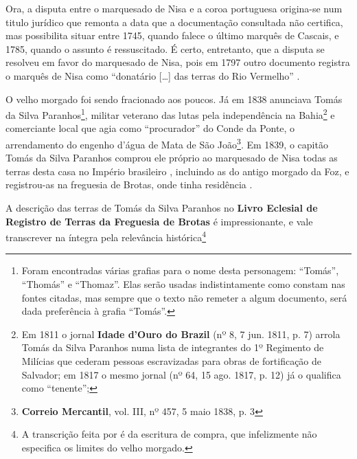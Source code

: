 Ora, a disputa entre o marquesado de Nisa e a coroa portuguesa origina-se num titulo jurídico que remonta a data que a documentação consultada não certifica, mas possibilita situar entre 1745, quando falece o último marquês de Cascais, e 1785, quando o assunto é ressuscitado. É certo, entretanto, que a disputa se resolveu em favor do marquesado de Nisa, pois em 1797 outro documento registra o marquês de Nisa como ``donatário [\dots] das terras do Rio Vermelho'' \cite[p.~543]{ramiz_expos_1881}.

O velho morgado foi sendo fracionado aos poucos. Já em 1838 anunciava Tomás da Silva Paranhos\footnote{Foram encontradas várias grafias para o nome desta personagem: ``Tomás'', ``Thomás'' e ``Thomaz''. Elas serão usadas indistintamente como constam nas fontes citadas, mas sempre que o texto não remeter a algum documento, será dada preferência à grafia ``Tomás''.}, militar veterano das lutas pela independência na Bahia\footnote{Em 1811 o jornal \textbf{Idade d'Ouro do Brazil} (nº 8, 7 jun. 1811, p. 7) arrola Tomás da Silva Paranhos numa lista de integrantes do 1º Regimento de Milícias que cederam pessoas escravizadas para obras de fortificação de Salvador; em 1817 o mesmo jornal (nº 64, 15 ago. 1817, p. 12) já o qualifica como ``tenente''; } e comerciante local que agia como ``procurador'' do Conde da Ponte, o arrendamento do engenho d'água de Mata de São João\footnote{\textbf{Correio Mercantil}, vol. III, nº 457, 5 maio 1838, p. 3}. Em 1839, o capitão Tomás da Silva Paranhos comprou ele próprio ao marquesado de Nisa todas as terras desta casa no Império brasileiro \cite[pp.~III-7 - III-12]{teixeira_doacoes_1978}, incluindo as do antigo morgado da Foz, e registrou-as na freguesia de Brotas, onde tinha residência \cite[p.~10]{ott_engenhos_1996}.

A descrição das terras de Tomás da Silva Paranhos no \textbf{Livro Eclesial de Registro de Terras da Freguesia de Brotas} é impressionante, e vale transcrever na íntegra pela relevância histórica\footnote{A transcrição feita por  é da escritura de compra, que infelizmente não especifica os limites do velho morgado.}

